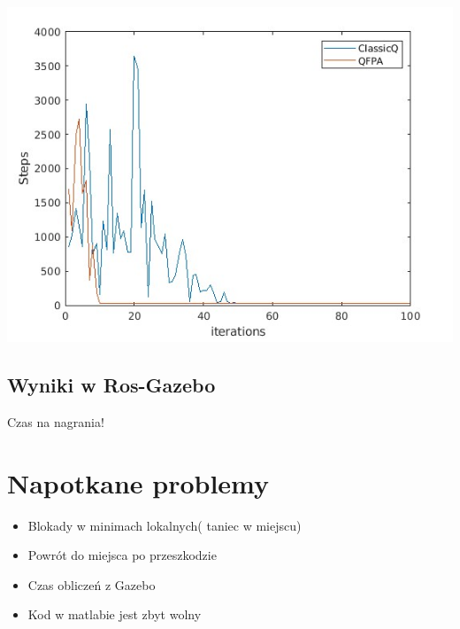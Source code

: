 \documentclass[aspectratio=169,15pt,]{beamer}
\begin{document}
\begin{frame}
\includegraphics[width =\textwidth,height=\textheight]{Obrazy/CompNoGazebo.jpg}
\end{frame}


\subsection{Wyniki w Ros-Gazebo}
\begin{frame}
	\subsectionpage
\end{frame}


\begin{frame}
\centering
\Huge{Czas na nagrania!}

\end{frame}

\section{Napotkane problemy}
\begin{frame}
	\sectionpage
\end{frame}

\begin{frame}


\begin{itemize}
 \item<1-> \large{Blokady w minimach lokalnych( taniec w miejscu)}
 \item<2->\large{Powrót do miejsca po przeszkodzie}
 \item<3-> \large{Czas obliczeń z Gazebo}
 \item<4-> \large{Kod w matlabie jest zbyt wolny}
\end{itemize}

\end{frame}
\end{document}
